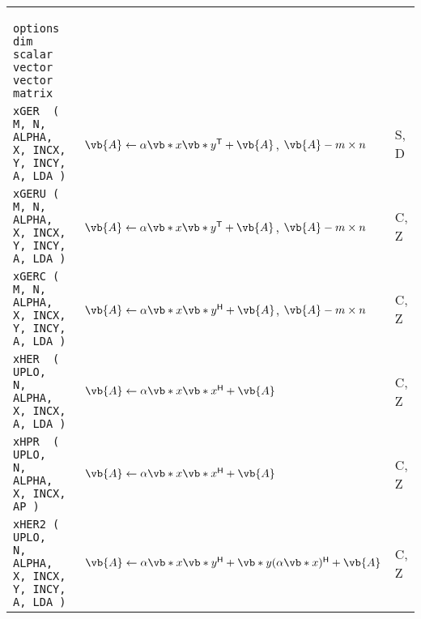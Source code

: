 \documentclass[10pt,a3paper, landscape]{article}
\newcommand{\T}{\mathsf{T}}
\renewcommand{\H}{\mathsf{H}}
\begin{document}
\begin{tabular}{lll}
		\verb|        options            dim   scalar vector   vector   matrix                         | &                                                                                                                                                                                                                                                              &                    \\
		\verb|xGER  (                    M, N, ALPHA, X, INCX, Y, INCY, A, LDA )                       | & $\vb{A} \gets \alpha \vb*{x}\vb*{y}^{\T} + \vb{A}$, $\vb{A} - m \times n$                                                                                                                                                                                    & S, D               \\
		\verb|xGERU (                    M, N, ALPHA, X, INCX, Y, INCY, A, LDA )                       | & $\vb{A} \gets \alpha \vb*{x}\vb*{y}^{\T} + \vb{A}$, $\vb{A} - m \times n$                                                                                                                                                                                    & C, Z               \\
		\verb|xGERC (                    M, N, ALPHA, X, INCX, Y, INCY, A, LDA )                       | & $\vb{A} \gets \alpha \vb*{x}\vb*{y}^{\H} + \vb{A}$, $\vb{A} - m \times n$                                                                                                                                                                                    & C, Z               \\
		\verb|xHER  ( UPLO,                 N, ALPHA, X, INCX,          A, LDA )                       | & $\vb{A} \gets \alpha \vb*{x}\vb*{x}^{\H} + \vb{A}$                                                                                                                                                                                                           & C, Z               \\
		\verb|xHPR  ( UPLO,                 N, ALPHA, X, INCX,          AP )                           | & $\vb{A} \gets \alpha \vb*{x}\vb*{x}^{\H} + \vb{A}$                                                                                                                                                                                                           & C, Z               \\
		\verb|xHER2 ( UPLO,                 N, ALPHA, X, INCX, Y, INCY, A, LDA )                       | & $\vb{A} \gets \alpha \vb*{x}\vb*{y}^{\H} + \vb*{y}(\alpha \vb*{x})^{\H} + \vb{A}$                                                                                                                                                                            & C, Z               \\

\end{tabular}
\end{document}
